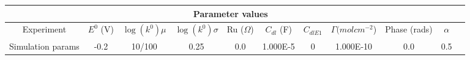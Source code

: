 \documentclass[preview]{standalone}
\begin{document}
\begin{center}
\begin{tabular}{|c|c|c|c|c|c|c|c|c|c|c|}
\hline
\multicolumn{10}{|c|}{Parameter values}\\
\hline
Experiment & $E^0$ (V) & $\log(k^0) \mu$ & $\log(k^0) \sigma$ & Ru ($\Omega$) & $C_{dl}$ (F) & $C_{dlE1}$ & $\Gamma (mol cm^{-2}$) & Phase (rads) & $\alpha$\\
\hline
Simulation params & -0.2 & 10/100 & 0.25 & 0.0 & 1.000E-5 & 0 & 1.000E-10 & 0.0 & 0.5\\
\hline
\end{tabular}
\end{center}
\end{document}

